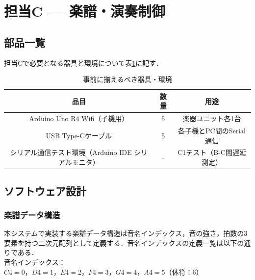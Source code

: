 \section{担当C — 楽譜・演奏制御}

\subsection{部品一覧}
担当Cで必要となる器具と環境について表\ref{need}に記す．

\begin{table}[H]
  \centering
  \caption{事前に揃えるべき器具・環境}
  \label{need}
  \begin{tabular}{|c|c|c|}
\hline
品目 & 数量 & 用途 \\\hline \hline
Arduino Uno R4 Wifi（子機用） & 5 & 楽器ユニット各1台 \\ \hline
USB Type-Cケーブル & 5 & 各子機とPC間のSerial通信 \\ \hline
シリアル通信テスト環境（Arduino IDE シリアルモニタ）& - & C1テスト（B-C間遅延測定） \\ \hline
  \end{tabular}  
\end{table}




\subsection{ソフトウェア設計}

\subsubsection{楽譜データ構造}
本システムで実装する楽譜データ構造は音名インデックス，音の強さ，拍数の3要素を持つ二次元配列として定義する．音名インデックスの定義一覧は以下の通りである．\\

音名インデックス：$C4=0，D4=1，E4=2，F4=3，G4=4，A4=5（休符：6）$\\

